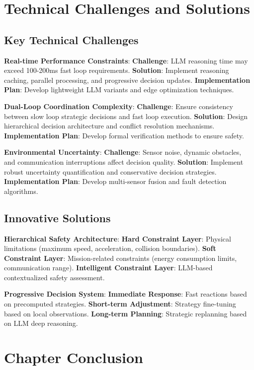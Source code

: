 {\section{Technical Challenges and Solutions}

\subsection{Key Technical Challenges}

\textbf{Real-time Performance Constraints}:
\textbf{Challenge}: LLM reasoning time may exceed 100-200ms fast loop requirements.
\textbf{Solution}: Implement reasoning caching, parallel processing, and progressive decision updates.
\textbf{Implementation Plan}: Develop lightweight LLM variants and edge optimization techniques.

\textbf{Dual-Loop Coordination Complexity}:
\textbf{Challenge}: Ensure consistency between slow loop strategic decisions and fast loop execution.
\textbf{Solution}: Design hierarchical decision architecture and conflict resolution mechanisms.
\textbf{Implementation Plan}: Develop formal verification methods to ensure safety.

\textbf{Environmental Uncertainty}:
\textbf{Challenge}: Sensor noise, dynamic obstacles, and communication interruptions affect decision quality.
\textbf{Solution}: Implement robust uncertainty quantification and conservative decision strategies.
\textbf{Implementation Plan}: Develop multi-sensor fusion and fault detection algorithms.

\subsection{Innovative Solutions}

\textbf{Hierarchical Safety Architecture}:
\textbf{Hard Constraint Layer}: Physical limitations (maximum speed, acceleration, collision boundaries).
\textbf{Soft Constraint Layer}: Mission-related constraints (energy consumption limits, communication range).
\textbf{Intelligent Constraint Layer}: LLM-based contextualized safety assessment.

\textbf{Progressive Decision System}:
\textbf{Immediate Response}: Fast reactions based on precomputed strategies.
\textbf{Short-term Adjustment}: Strategy fine-tuning based on local observations.
\textbf{Long-term Planning}: Strategic replanning based on LLM deep reasoning.

\section{Chapter Conclusion}

}
